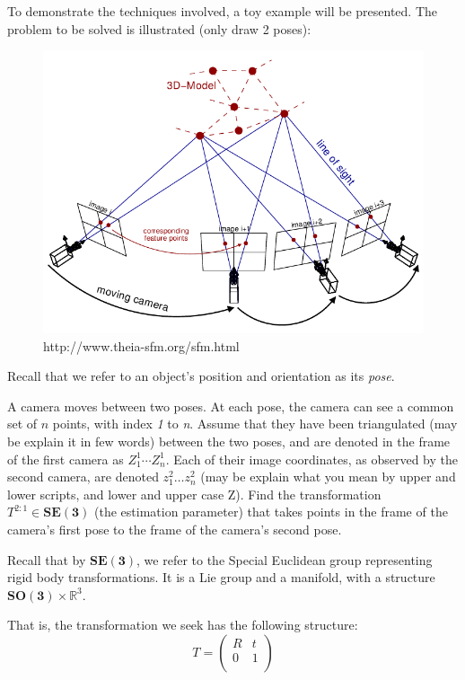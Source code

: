 \documentclass[twoside]{article}
\begin{document}
To demonstrate the techniques involved, a toy example will be presented. The problem to be solved is illustrated (only draw 2 poses):
\begin{figure}[h]
      	\centering
      	\includegraphics[scale=0.2]{incremental_sfm.png}
      	\caption{http://www.theia-sfm.org/sfm.html}
\end{figure}

Recall that we refer to an object's position and orientation as its \textit{pose}.

A camera moves between two poses. At each pose, the camera can see a common set of $n$ points, with index \textit{1} to \textit{n}. Assume that they have been triangulated (may be explain it in few words) between the two poses, and are denoted in the frame of the first camera as $Z_1^1 \cdots Z_n^1$. Each of their image coordinates, as observed by the second camera, are denoted $z_1^2 \dots z_n^2$ (may be explain what you mean by upper and lower scripts, and lower and upper case Z). Find the transformation $T^{2:1} \in \mathbf{SE(3)}$ (the estimation parameter) that takes points in the frame of the camera's first pose to the frame of the camera's second pose.

Recall that by $\mathbf{SE(3)}$, we refer to the Special Euclidean group representing rigid body transformations. It is a Lie group and a manifold, with a structure $\mathbf{SO(3)} \times \mathbb{R}^3$.

That is, the transformation we seek has the following structure:
\begin{equation}
T =
\begin{pmatrix}
R & t \\
0 & 1\\
\end{pmatrix}
\end{equation}
\end{document}
